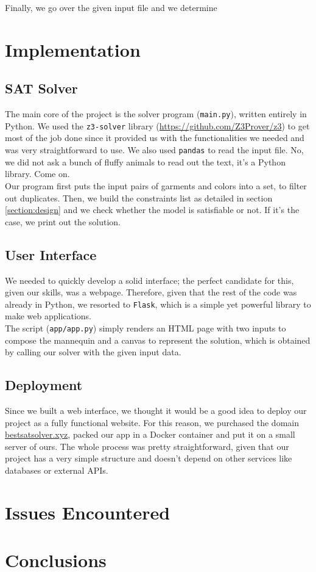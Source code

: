 \documentclass[12pt]{article}
\begin{document}
    Finally, we go over the given input file and we determine


\section{Implementation}

    \subsection{SAT Solver}
        The main core of the project is the solver program (\texttt{main.py}), written entirely in Python. 
        We used the \texttt{z3-solver} library (\url{https://github.com/Z3Prover/z3}) to get most of the job done since it provided us with the functionalities
        we needed and was very straightforward to use. We also used \texttt{pandas} to read the input file. No, we did not ask a bunch of fluffy animals to read out the text, it's a Python library. Come on.\\
        Our program first puts the input pairs of garments and colors into a set, to filter out duplicates. Then, we build the constraints list as detailed in section \ref{section:design} and we check whether the model is
        satisfiable or not. If it's the case, we print out the solution.

    \subsection{User Interface}
        We needed to quickly develop a solid interface; the perfect candidate for this, given our skills, was a webpage. Therefore, given that the rest of the code
        was already in Python, we resorted to \texttt{Flask}, which is a simple yet powerful library to make web applications.\\
        The script (\texttt{app/app.py}) simply renders an HTML page with two inputs to compose the mannequin and a canvas to represent the solution, which is obtained by 
        calling our solver with the given input data.


    \subsection{Deployment}
        Since we built a web interface, we thought it would be a good idea to deploy our project as a fully functional website. 
        For this reason, we purchased the domain \url{bestsatsolver.xyz}, packed our app in a Docker container and put it on a small server of ours.
        The whole process was pretty straightforward, given that our project has a very simple structure and doesn't depend on other services like databases or external APIs.

\section{Issues Encountered}
\label{section:issues}


\section{Conclusions}
\end{document}
